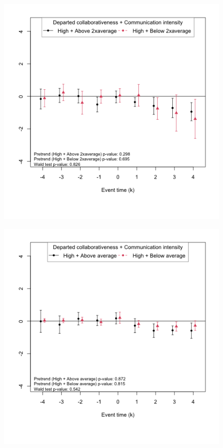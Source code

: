 \begin{figure}[htbp]
\begin{minipage}[b]{0.49\textwidth}
        \includegraphics[width=\textwidth]{temp/output/collab_imp/inv0_cs_norm_prs_opened_dept_comm_2avg_above_High.png}
    \end{minipage}
    \begin{minipage}[b]{0.49\textwidth}
        \centering
         \label{fig:predep_prs_opened_high_collab_comm_int_marg_inv1}
        \includegraphics[width=\textwidth]{temp/output/collab_imp/inv1_cs_norm_prs_opened_dept_comm_avg_above_High.png}

\end{minipage}
\end{figure}
